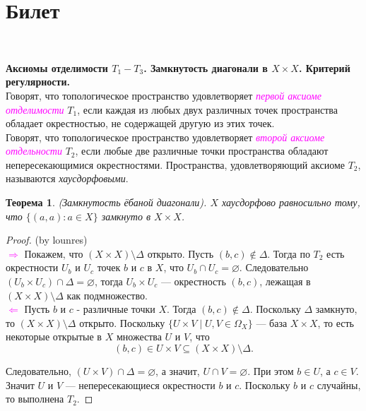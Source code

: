 \documentclass[a4paper,100pt]{article}
\theoremstyle{indented}
\newtheorem{theorem}{Теорема}
\begin{document}
\section{Билет} \

\medskip

\textbf{Аксиомы отделимости $T_1 - T_3$. Замкнутость диагонали в $X\times X$. Критерий регулярности.}\\

Говорят, что топологическое пространство удовлетворяет \textcolor{magenta}{\textit{первой аксиоме отделимости}} $T_1$, если каждая из любых двух различных точек пространства обладает окрестностью, не содержащей другую из этих точек.\\

Говорят, что топологическое пространство удовлетворяет \textcolor{magenta}{\textit{второй аксиоме отдельности}} $T_2$, если любые две различные точки пространства обладают непересекающимися окрестностями. Пространства, удовлетворяющий аксиоме $T_2$, называются \textit{хаусдорфовыми}.\\

\begin{theorem}
    (Замкнутость ёбаной диагонали). $X$ хаусдорфово равносильно тому, что $\{(a,a):a\in X\}$ замкнуто в $X\times X$.
\end{theorem}

\begin{proof}
    (by lounres) \\

    \textcolor{magenta}{$\Rightarrow$} Покажем, что $(X \times X) \setminus \Delta$ открыто. Пусть $(b, c) \notin \Delta$. Тогда по $T_2$ есть окрестности $U_b$ и $U_c$ точек $b$ и $c$ в $X$, что $U_b \cap U_c = \varnothing$. Следовательно $(U_b \times U_c) \cap \Delta = \varnothing$, тогда $U_b \times U_c$ --- окрестность $(b, c)$, лежащая в $(X \times X) \setminus \Delta$ как подмножество. \\

    \textcolor{magenta}{$\Leftarrow$} Пусть $b$ и $c$ - различные точки $X$. Тогда $(b, c) \notin \Delta$. Поскольку $\Delta$ замкнуто, то $(X \times X) \setminus \Delta$ открыто. Поскольку $\{U \times V \mid U, V \in \Omega_X\}$ --- база $X \times X$, то есть некоторые открытые в $X$ множества $U$ и $V$, что
        \[
            (b, c) \in U \times V \subseteq (X \times X) \setminus \Delta.
        \]
            
        Следовательно, $(U \times V) \cap \Delta = \varnothing$, а значит, $U \cap V = \varnothing$. При этом $b \in U$, а $c \in V$. Значит $U$ и $V$ --- непересекающиеся окрестности $b$ и $c$. Поскольку $b$ и $c$ случайны, то выполнена $T_2$. 
\end{proof}
\end{document}
